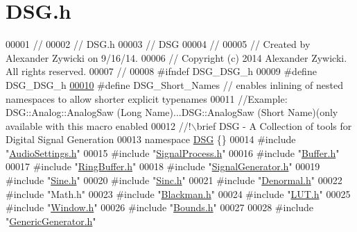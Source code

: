 \hypertarget{_d_s_g_8h_source}{\section{D\+S\+G.\+h}
\label{_d_s_g_8h_source}
}

\begin{DoxyCode}
00001 \textcolor{comment}{//}
00002 \textcolor{comment}{//  DSG.h}
00003 \textcolor{comment}{//  DSG}
00004 \textcolor{comment}{//}
00005 \textcolor{comment}{//  Created by Alexander Zywicki on 9/16/14.}
00006 \textcolor{comment}{//  Copyright (c) 2014 Alexander Zywicki. All rights reserved.}
00007 \textcolor{comment}{//}
00008 \textcolor{preprocessor}{#ifndef DSG\_DSG\_h}
00009 \textcolor{preprocessor}{#define DSG\_DSG\_h}
\hypertarget{_d_s_g_8h_source_l00010}{}\hyperlink{_d_s_g_8h_a83f0da18914977ca7a09b93cb1f57a05}{00010} \textcolor{preprocessor}{#define DSG\_Short\_Names // enables inlining of nested namespaces to allow shorter explicit typenames}
00011 \textcolor{comment}{//Example: DSG::Analog::AnalogSaw (Long Name)...DSG::AnalogSaw (Short Name)(only available with this macro
       enabled}\textcolor{comment}{}
00012 \textcolor{comment}{//!\(\backslash\)brief DSG - A Collection of tools for Digital Signal Generation}
00013 \textcolor{comment}{}\textcolor{keyword}{namespace }\hyperlink{namespace_d_s_g}{DSG} \{\}
00014 \textcolor{preprocessor}{#include "\hyperlink{_audio_settings_8h}{AudioSettings.h}"}
00015 \textcolor{preprocessor}{#include "\hyperlink{_signal_process_8h}{SignalProcess.h}"}
00016 \textcolor{preprocessor}{#include "\hyperlink{_buffer_8h}{Buffer.h}"}
00017 \textcolor{preprocessor}{#include "\hyperlink{_ring_buffer_8h}{RingBuffer.h}"}
00018 \textcolor{preprocessor}{#include "\hyperlink{_signal_generator_8h}{SignalGenerator.h}"}
00019 \textcolor{preprocessor}{#include "\hyperlink{_sine_8h}{Sine.h}"}
00020 \textcolor{preprocessor}{#include "\hyperlink{_sinc_8h}{Sinc.h}"}
00021 \textcolor{preprocessor}{#include "\hyperlink{_denormal_8h}{Denormal.h}"}
00022 \textcolor{preprocessor}{#include "Math.h"}
00023 \textcolor{preprocessor}{#include "\hyperlink{_blackman_8h}{Blackman.h}"}
00024 \textcolor{preprocessor}{#include "\hyperlink{_l_u_t_8h}{LUT.h}"}
00025 \textcolor{preprocessor}{#include "\hyperlink{_window_8h}{Window.h}"}
00026 \textcolor{preprocessor}{#include "\hyperlink{_bounds_8h}{Bounds.h}"}
00027 
00028 \textcolor{preprocessor}{#include "\hyperlink{_generic_generator_8h}{GenericGenerator.h}"}

\end{DoxyCode}
